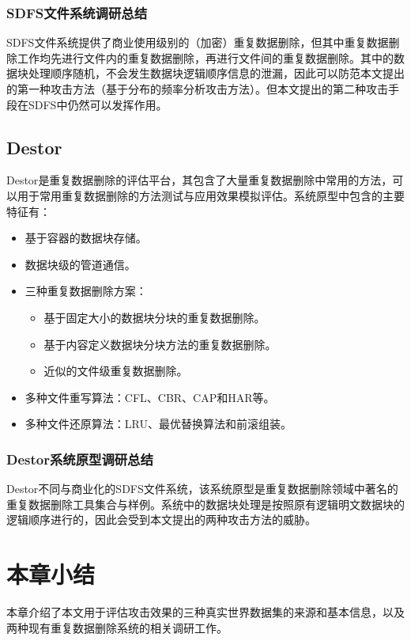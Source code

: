 \subsubsection{SDFS文件系统调研总结}

SDFS文件系统提供了商业使用级别的（加密）重复数据删除，但其中重复数据删除工作均先进行文件内的重复数据删除，再进行文件间的重复数据删除。其中的数据块处理顺序随机，不会发生数据块逻辑顺序信息的泄漏，因此可以防范本文提出的第一种攻击方法（基于分布的频率分析攻击方法）。但本文提出的第二种攻击手段在SDFS中仍然可以发挥作用。

\subsection{Destor}

Destor\cite{fu2015design}是重复数据删除的评估平台，其包含了大量重复数据删除中常用的方法，可以用于常用重复数据删除的方法测试与应用效果模拟评估。系统原型中包含的主要特征有：

\begin{itemize}
    \item 基于容器的数据块存储。
    \item 数据块级的管道通信。
    \item 三种重复数据删除方案：
    \begin{itemize}
        \item 基于固定大小的数据块分块的重复数据删除。
        \item 基于内容定义数据块分块方法的重复数据删除。
        \item 近似的文件级重复数据删除。
    \end{itemize}
    \item 多种文件重写算法：CFL、CBR、CAP和HAR等。
    \item 多种文件还原算法：LRU、最优替换算法和前滚组装。
\end{itemize}

\subsubsection{Destor系统原型调研总结}

Destor不同与商业化的SDFS文件系统，该系统原型是重复数据删除领域中著名的重复数据删除工具集合与样例。系统中的数据块处理是按照原有逻辑明文数据块的逻辑顺序进行的，因此会受到本文提出的两种攻击方法的威胁。

\section{本章小结}
本章介绍了本文用于评估攻击效果的三种真实世界数据集的来源和基本信息，以及两种现有重复数据删除系统的相关调研工作。
